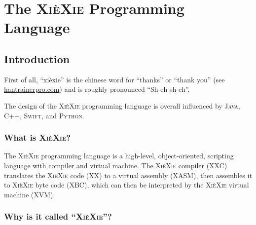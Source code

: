 \documentclass[a5paper]{report}
\def\xiexie{\textsc{Xi\`eXie}\xspace}
\def\xxlang{\xiexie programming language\xspace}
\def\cpp{\textsc{C++}\xspace}
\def\java{\textsc{Java}\xspace}
\def\swift{\textsc{Swift}\xspace}
\def\python{\textsc{Python}\xspace}
\begin{document}
\tableofcontents



\part{The \xiexie Programming Language}



\chapter{Introduction}

First of all, ``xi\`exie'' is the chinese word for ``thanks'' or ``thank you''
(see \href{http://dictionary.hantrainerpro.com/chinese-english/translation-xiexie_thankyou.htm}{hantrainerpro.com})
and is roughly pronounced ``Sh-eh sh-eh''.

The design of the \xxlang is overall influenced by \java, \cpp, \swift, and \python.



\section{What is \xiexie?}

The \xiexie programming language is a high-level, object-oriented, scripting language with compiler and virtual machine.
The \xiexie compiler (XXC) translates the \xiexie code (XX) to a virtual assembly (XASM), then assembles it to
\xiexie byte code (XBC), which can then be interpreted by the \xiexie virtual machine (XVM).



\section{Why is it called ``\xiexie''?}
\end{document}
